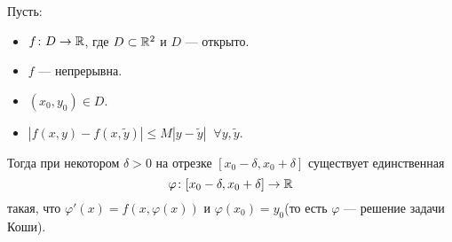 \begin{theorem}[Пикара]
Пусть:
\begin{itemize}
    \item $f\colon D \to \mathbb{R}$, где $D \subset \mathbb{R}^2$ и $D$ --- открыто.
    \item $f$ --- непрерывна.
    \item $(x_0, y_0) \in D$.
    \item $|f(x, y) - f(x, \widetilde{y})| \leqslant M |y - \widetilde{y} | \;\; \forall y, \widetilde{y}$.
\end{itemize}
Тогда при некотором $\delta > 0$ на отрезке $[x_0 - \delta, x_0 + \delta]$ существует единственная 
\begin{equation*}
    \varphi\colon [x_0 - \delta, x_0 + \delta] \to \mathbb{R}
\end{equation*}
такая, что $\varphi'(x) = f(x, \varphi(x))$ и $\varphi(x_0) = y_0$(то есть $\varphi$ --- решение задачи Коши).
\end{theorem}
